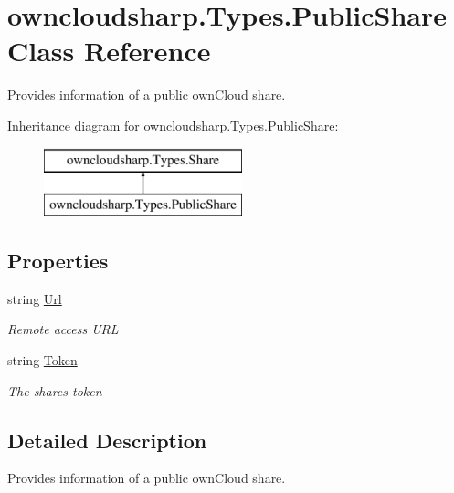 \hypertarget{classowncloudsharp_1_1_types_1_1_public_share}{}\section{owncloudsharp.\+Types.\+Public\+Share Class Reference}
\label{classowncloudsharp_1_1_types_1_1_public_share}


Provides information of a public own\+Cloud share.  


Inheritance diagram for owncloudsharp.\+Types.\+Public\+Share\+:\begin{figure}[H]
\begin{center}
\leavevmode
\includegraphics[height=2.000000cm]{classowncloudsharp_1_1_types_1_1_public_share}
\end{center}
\end{figure}
\subsection*{Properties}
\begin{DoxyCompactItemize}
\item 
string \hyperlink{classowncloudsharp_1_1_types_1_1_public_share_a25d939622a2d70b31a7885cfc4e9fe73}{Url}
\begin{DoxyCompactList}\small\item\em Remote access U\+R\+L \end{DoxyCompactList}\item 
string \hyperlink{classowncloudsharp_1_1_types_1_1_public_share_a59e47ec6de51eb32aedba520e5fb5e49}{Token}
\begin{DoxyCompactList}\small\item\em The shares token \end{DoxyCompactList}\end{DoxyCompactItemize}


\subsection{Detailed Description}
Provides information of a public own\+Cloud share. 



